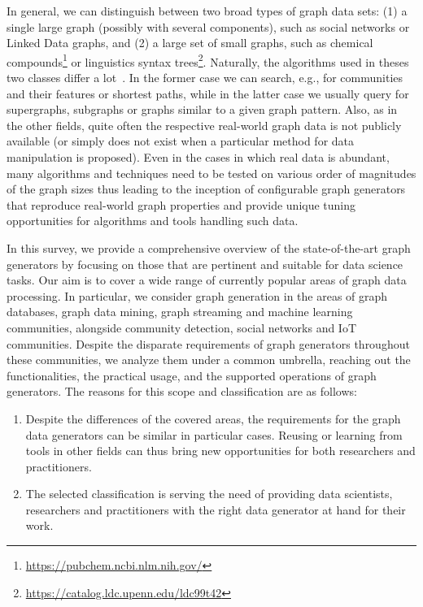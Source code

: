 In general, we can distinguish between two broad types of graph data sets: (1) a single large graph (possibly with several components), such as social networks  or Linked Data graphs, and (2) a large set of small graphs, such as chemical compounds\footnote{\url{https://pubchem.ncbi.nlm.nih.gov/}} or linguistics syntax trees\footnote{\url{https://catalog.ldc.upenn.edu/ldc99t42}}. Naturally, the algorithms used in theses two classes differ a lot~\cite{DBLP:books/igi/Sakr2011}. In the former case we can search, e.g., for communities and their features or shortest paths, while in the latter case we usually query for supergraphs, subgraphs or graphs similar to a given graph pattern. Also, as in the other fields, quite often the respective real-world graph data is not publicly available (or simply does not exist when a particular method for data manipulation is proposed).
Even in the cases in which real data is abundant, many algorithms and techniques need to be tested on various order of magnitudes of the graph sizes thus leading to the inception of
configurable graph generators that reproduce real-world graph properties and provide unique tuning opportunities for
algorithms and tools handling such data.

In this survey, we provide a comprehensive overview of the state-of-the-art graph generators by focusing on those that are pertinent and suitable for data science tasks. Our aim is to cover a wide range of currently popular areas of graph data processing. In particular, we consider graph generation in the areas of graph databases, graph data mining, graph streaming and machine learning communities, alongside community detection, social networks and IoT communities. Despite the disparate requirements of graph generators throughout these communities, we analyze them under a common umbrella, reaching out the functionalities, the practical usage, and the supported operations of graph generators. The reasons for this scope and classification are as follows:

\begin{enumerate}
  \item Despite the differences of the covered areas, the requirements for the graph data generators can be similar in particular cases. Reusing or learning from tools in other fields can thus bring new opportunities for both researchers and practitioners.
  \item The selected classification is serving the need of providing data scientists, researchers and practitioners with the right data generator at hand for their work.
\end{enumerate}

